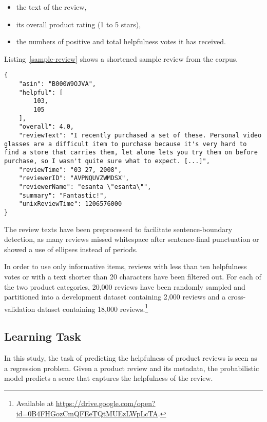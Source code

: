 \documentclass[
    a4paper,%
    12pt,%
    oneside,%
    toc=bibliography,
    final,
]{scrartcl}
\begin{document}
\begin{itemize}
\item the text of the review,
\item its overall product rating (1 to 5 stars),
\item the numbers of positive and total helpfulness votes it has received.
\end{itemize}

Listing~\ref{sample-review} shows a shortened sample review from the corpus.

\begin{lstlisting}[basicstyle=\ttfamily\small\singlespacing, caption=Sample review (shortened) from the “Electronics” category., label=sample-review, float]
{
    "asin": "B000W9OJVA",
    "helpful": [
        103,
        105
    ],
    "overall": 4.0,
    "reviewText": "I recently purchased a set of these. Personal video glasses are a difficult item to purchase because it's very hard to find a store that carries them, let alone lets you try them on before purchase, so I wasn't quite sure what to expect. [...]",
    "reviewTime": "03 27, 2008",
    "reviewerID": "AVPNQUVZWMDSX",
    "reviewerName": "esanta \"esanta\"",
    "summary": "Fantastic!",
    "unixReviewTime": 1206576000
}
\end{lstlisting}

The review texts have been preprocessed to facilitate sentence-boundary detection, as many reviews missed whitespace after sentence-final punctuation or showed a use of ellipses instead of periods.

In order to use only informative items, reviews with less than ten helpfulness votes or with a text shorter than 20 characters have been filtered out. For each of the two product categories, 20,000 reviews have been randomly sampled and partitioned into a development dataset containing 2,000 reviews and a cross-validation dataset containing 18,000 reviews.\footnote{Available at \url{https://drive.google.com/open?id=0B4FHGozCmQFEeTQtMUEzLWpLcTA}.}

\subsection{Learning Task}

In this study, the task of predicting the helpfulness of product reviews is seen as a regression problem. Given a product review and its metadata, the probabilistic model predicts a score that captures the helpfulness of the review.
\end{document}

